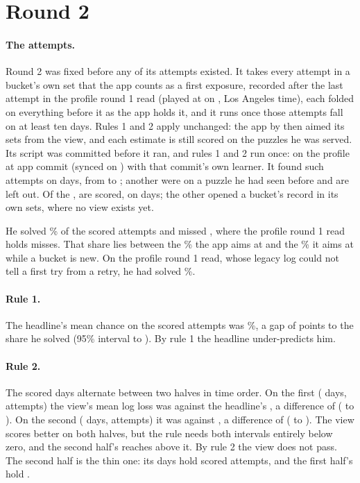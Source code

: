 \documentclass[11pt]{article}
\begin{document}
\section{Round 2}

\paragraph{The attempts.} Round 2 was fixed before any of its attempts existed. It takes every
attempt in a bucket's own set that the app counts as a first exposure, recorded after the last
attempt in the profile round 1 read (played at \TwoCutoffClock{} on \LastDay, Los Angeles time),
each folded on everything before it as the app holds it, and it runs once those attempts fall on
at least ten days. Rules 1 and 2 apply unchanged: the app by then aimed its sets from the view,
and each estimate is still scored on the puzzles he was served. Its script was committed before it
ran, and rules 1 and 2 run once: on the profile at app commit \TwoCommit{} (synced on \TwoSynced)
with that commit's own learner. It found \TwoAll{} such attempts on \TwoAllDays{} days, from \TwoFrom{} to \TwoTo;
another \TwoLeftOut{} were on a puzzle he had seen before and are left out. Of the \TwoAll,
\TwoAttempts{} are scored, on \TwoDays{} days; the other \TwoOpened{} opened a bucket's record in
its own sets, where no view exists yet.

He solved \TwoSolved\% of the scored attempts and missed \TwoMisses, where the profile round 1
read holds \PMisses{} misses. That share lies between the \TargetCore\% the app aims at and the
\TargetNew\% it aims at while a bucket is new. On the profile round 1 read, whose legacy log could
not tell a first try from a retry, he had solved \PSolved\%.

\paragraph{Rule 1.} The headline's mean chance on the scored attempts was \TwoHead\%, a gap of
\TwoGap{} points to the share he solved (95\% interval \TwoGapLo{} to \TwoGapHi). By rule 1 the
headline under-predicts him.

\paragraph{Rule 2.} The scored days alternate between two halves in time order. On the first
(\TwoHOneDays{} days, \TwoHOneAttempts{} attempts) the view's mean log loss was \TwoHOneView{}
against the headline's \TwoHOneHead, a difference of \TwoHOneDiff{} (\TwoHOneLo{} to \TwoHOneHi).
On the second (\TwoHTwoDays{} days, \TwoHTwoAttempts{} attempts) it was \TwoHTwoView{} against
\TwoHTwoHead, a difference of \TwoHTwoDiff{} (\TwoHTwoLo{} to \TwoHTwoHi). The view scores better
on both halves, but the rule needs both intervals entirely below zero, and the second half's
reaches above it. By rule 2 the view does not pass. The second half is the thin one: its days hold
\TwoHTwoList{} scored attempts, and the first half's hold \TwoHOneList.
\end{document}

